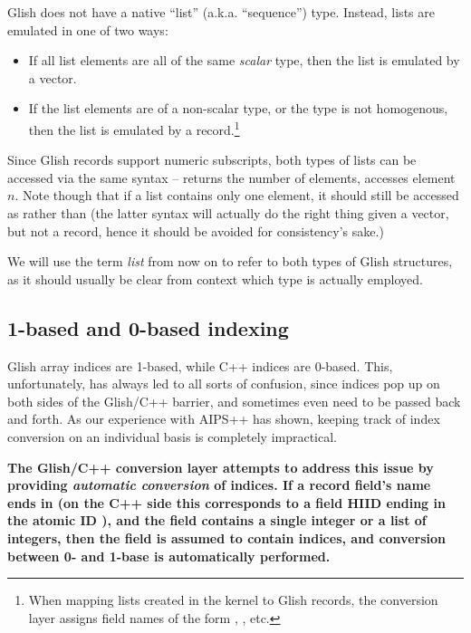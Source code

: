   Glish does not have a native ``list'' (a.k.a. ``sequence'') type.
  Instead, lists are emulated in one of two ways:

  \begin{itemize}

  \item If all list elements are all of the same {\em scalar} type,
  then the list is emulated by a vector.
  
  \item If the list elements are of a non-scalar type, or the type is not
  homogenous, then the list is emulated by a record.\footnote{When mapping lists created
  in the kernel to Glish records, the conversion layer assigns field names of
  the form , , etc.}
  \end{itemize}

  Since Glish records support numeric subscripts, both types of lists can be
  accessed via the same syntax --  returns the number of
  elements,  accesses element $n$. Note though that if a list
  contains only one element, it should still be accessed as  rather
  than  (the latter syntax will actually do the right thing given a
  vector, but not a record, hence it should be avoided for consistency's sake.)

  We will use the term {\em list} from now on to refer to both types of Glish
  structures, as it should usually be clear from context which type is actually
  employed.


\subsection{1-based and 0-based indexing}
  \label{sec:indexconv}

  Glish array indices are 1-based, while C++ indices are 0-based. This,
  unfortunately, has always led to all sorts of confusion, since indices pop up
  on both sides of the Glish/C++ barrier, and sometimes even need to be passed
  back and forth. As our experience with AIPS++ has shown, keeping track of
  index conversion on an individual basis is completely impractical.

  {\bf The Glish/C++ conversion layer attempts to address this issue by
  providing {\em automatic conversion} of indices. If a record field's name
  ends in  (on the C++ side this corresponds to a field HIID ending
  in the atomic ID ), and the field contains a single integer or a
  list of integers, then the field is assumed to contain indices, and
  conversion between 0- and 1-base is automatically performed.}

